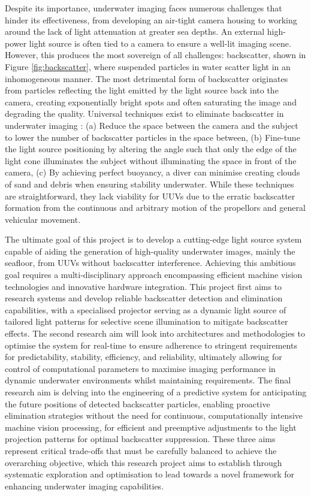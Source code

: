 Despite its importance, underwater imaging faces numerous challenges that hinder its effectiveness, from developing an air-tight camera housing to working around the lack of light attenuation at greater sea depths. An external high-power light source is often tied to a camera to ensure a well-lit imaging scene. However, this produces the most sovereign of all challenges: backscatter, shown in Figure \ref{fig:backscatter}, where suspended particles in water scatter light in an inhomogeneous manner. The most detrimental form of backscatter originates from particles reflecting the light emitted by the light source back into the camera, creating exponentially bright spots and often saturating the image and degrading the quality. Universal techniques exist to eliminate backscatter in underwater imaging \cite{brentdurandEasyWaysEliminate2013}: (a) Reduce the space between the camera and the subject to lower the number of backscatter particles in the space between, (b) Fine-tune the light source positioning by altering the angle such that only the edge of the light cone illuminates the subject without illuminating the space in front of the camera, (c) By achieving perfect buoyancy, a diver can minimise creating clouds of sand and debris when ensuring stability underwater. While these techniques are straightforward, they lack viability for UUVs due to the erratic backscatter formation from the continuous and arbitrary motion of the propellors and general vehicular movement.

The ultimate goal of this project is to develop a cutting-edge light source system capable of aiding the generation of high-quality underwater images, mainly the seafloor, from UUVs without backscatter interference. Achieving this ambitious goal requires a multi-disciplinary approach encompassing efficient machine vision technologies and innovative hardware integration. This project first aims to research systems and develop reliable backscatter detection and elimination capabilities, with a specialised projector serving as a dynamic light source of tailored light patterns for selective scene illumination to mitigate backscatter effects. The second research aim will look into architectures and methodologies to optimise the system for real-time to ensure adherence to stringent requirements for predictability, stability, efficiency, and reliability, ultimately allowing for control of computational parameters to maximise imaging performance in dynamic underwater environments whilst maintaining requirements. The final research aim is delving into the engineering of a predictive system for anticipating the future positions of detected backscatter particles, enabling proactive elimination strategies without the need for continuous, computationally intensive machine vision processing, for efficient and preemptive adjustments to the light projection patterns for optimal backscatter suppression. These three aims represent critical trade-offs that must be carefully balanced to achieve the overarching objective, which this research project aims to establish through systematic exploration and optimisation to lead towards a novel framework for enhancing underwater imaging capabilities.

